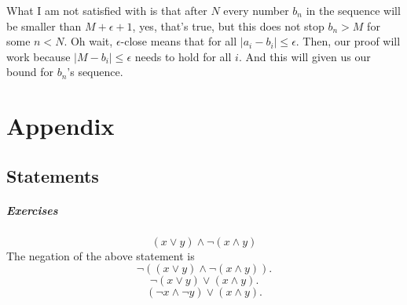 \documentclass{report}
\begin{document}
What I am not satisfied with is that after $N$ every number  $b_n$ in the sequence will be smaller than $M+\epsilon + 1$, yes, that's true, but this does not stop  $b_n > M $ for some  $n < N$. Oh wait,  $\epsilon$-close means that for all $|a_i -b_i| \le \epsilon$. Then, our proof will work because  $|M-b_i| \le \epsilon$ needs to hold for all  $i$. And this will given us our bound for  $b_n$'s sequence.































































\chapter*{Appendix}
\section{Statements}
\paragraph{Exercises}
\subsection{}
\[
	(x \lor y ) \land \neg (x \land y)
\] 
The negation of the above statement is
\[
\lnot ((x \lor y) \land \neg (x \land y))
.\] 
\[
\lnot (x \lor y) \lor  (x \land y)
.\]
\[
(\neg x \land \neg y) \lor (x \land y)
.\]
\end{document}
